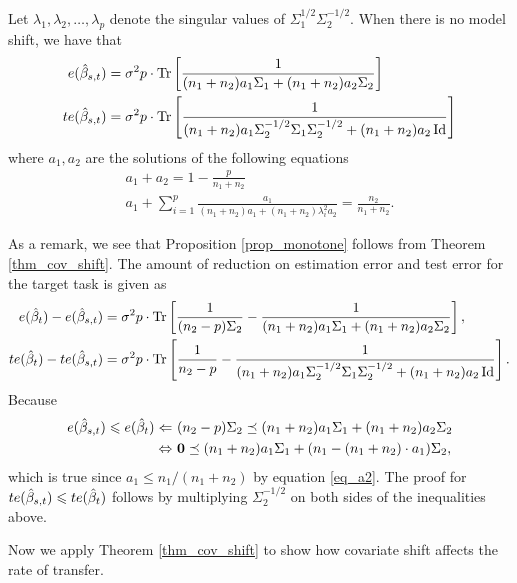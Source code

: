 \begin{theorem}\label{thm_cov_shift}
	Let $\lambda_1, \lambda_2, \dots, \lambda_p$ denote the singular values of $\Sigma_1^{1/2}\Sigma_2^{-1/2}$.
	When there is no model shift, we have that
	\begin{align*}
		e(\hat{\beta}_{s,t}) &= \sigma^2 p \cdot \operatorname{Tr}\left[\frac 1 {(n_1 + n_2)a_1\Sigma_1 + (n_1 + n_2)a_2\Sigma_2}\right] \\
		te(\hat{\beta}_{s,t}) &= \sigma^2 p \cdot \operatorname{Tr}\left[\frac 1 {(n_1 + n_2)a_1\Sigma_2^{-1/2}\Sigma_1\Sigma_2^{-1/2} + (n_1 + n_2)a_2\operatorname{Id}}\right]
	\end{align*}
	where $a_1, a_2$ are the solutions of the following equations
	\begin{gather}
		 a_1 + a_2 = 1- \frac{p}{n_1 + n_2} \label{eq_a1}\\
		 a_1 + \sum_{i=1}^p \frac{a_1}{(n_1 + n_2)a_1 + (n_1 + n_2)\lambda_i^2 a_2} = \frac{n_2}{n_1 + n_2}. \label{eq_a2}
	\end{gather}
\end{theorem}

As a remark, we see that Proposition \ref{prop_monotone} follows from Theorem \ref{thm_cov_shift}.
The amount of reduction on estimation error and test error for the target task is given as
	\begin{align*}
		e(\hat{\beta}_t) - e(\hat{\beta}_{s,t})
		&= \sigma^2 p \cdot \operatorname{Tr}\left[\frac 1 {(n_2 - p) \Sigma_2} - \frac 1 {(n_1 + n_2)a_1 \Sigma_1 + (n_1 + n_2)a_2 \Sigma_2}\right], \\
		te(\hat{\beta}_t) - te(\hat{\beta}_{s,t})
		&= \sigma^2 p \cdot \operatorname{Tr}\left[\frac 1 {n_2 - p} - \frac 1 {(n_1 + n_2)a_1\Sigma_2^{-1/2}\Sigma_1\Sigma_2^{-1/2} + (n_1 + n_2)a_2\operatorname{Id}}\right].
	\end{align*}
Because
\begin{align*}
	e(\hat{\beta}_{s,t}) \leqslant e(\hat{\beta}_t)
	\Leftarrow~ & (n_2 - p)\Sigma_2 \preceq (n_1 + n_2) a_1 \Sigma_1 + (n_1 + n_2)a_2 \Sigma_2 \\
	\Leftrightarrow~ & \mathbf{0} \preceq (n_1 + n_2) a_1 \Sigma_1 + (n_1 - (n_1 + n_2)\cdot a_1) \Sigma_2,
\end{align*}
which is true since $a_1 \le n_1 / (n_1 + n_2)$ by equation \eqref{eq_a2}.
The proof for $te(\hat{\beta}_{s,t}) \leqslant te(\hat{\beta}_t)$ follows by multiplying $\Sigma_2^{-1/2}$ on both sides of the inequalities above.

Now we apply Theorem \ref{thm_cov_shift} to show how covariate shift affects the rate of transfer.

